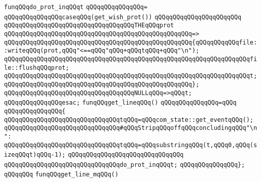 \newline
\newline
\verb|funqQQqdo_prot_inqQQqt|\newline
\verb|qQQqqQQqqQQqqQQq=|\newline
\verb|qQQqqQQqqQQqqQQqcaseqQQq(get_wish_prot())|\newline
\verb|qQQqqQQqqQQqqQQqqQQqqQQq|\newline
\verb|qQQqqQQqqQQqqQQqqQQqqQQqqQQqqQQqqQQqTHEqQQqprot|\newline
\verb|qQQqqQQqqQQqqQQqqQQqqQQqqQQqqQQqqQQqqQQqqQQqqQQqqQQq=>|\newline
\verb|qQQqqQQqqQQqqQQqqQQqqQQqqQQqqQQqqQQqqQQqqQQqqQQqqQQq{qQQqqQQqqQQqfile::writeqQQq(prot,qQQq"<==qQQq"qQQq+qQQqtqQQq+qQQq"\n");|\newline
\verb|qQQqqQQqqQQqqQQqqQQqqQQqqQQqqQQqqQQqqQQqqQQqqQQqqQQqqQQqqQQqqQQqqQQqfile::flushqQQqprot;|\newline
\verb|qQQqqQQqqQQqqQQqqQQqqQQqqQQqqQQqqQQqqQQqqQQqqQQqqQQqqQQqqQQqqQQqqQQqt;|\newline
\verb|qQQqqQQqqQQqqQQqqQQqqQQqqQQqqQQqqQQqqQQqqQQqqQQqqQQq};|\newline
\newline
\verb|qQQqqQQqqQQqqQQqqQQqqQQqqQQqqQQqqQQqNULLqQQq=>qQQqt;|\newline
\verb|qQQqqQQqqQQqqQQqesac;|\newline
\newline
\verb|funqQQqget_lineqQQq()|\newline
\verb|qQQqqQQqqQQqqQQq=qQQq|\newline
\verb|qQQqqQQqqQQqqQQq{|\newline
\verb|qQQqqQQqqQQqqQQqqQQqqQQqqQQqqQQqtqQQq=qQQqcom_state::get_eventqQQq();|\newline
\newline
\verb|qQQqqQQqqQQqqQQqqQQqqQQqqQQqqQQq#qQQqStripqQQqoffqQQqconcludingqQQq"\n":|\newline
\newline
\verb|qQQqqQQqqQQqqQQqqQQqqQQqqQQqqQQqtqQQq=qQQqsubstringqQQq(t,qQQq0,qQQq(sizeqQQqt)qQQq-1);|\newline
\verb|qQQqqQQqqQQqqQQqqQQqqQQqqQQqqQQq|\newline
\verb|qQQqqQQqqQQqqQQqqQQqqQQqqQQqqQQqdo_prot_inqQQqt;|\newline
\verb|qQQqqQQqqQQqqQQq};|\newline
\verb|qQQqqQQq|\newline
\verb|funqQQqget_line_mqQQq()|\newline
